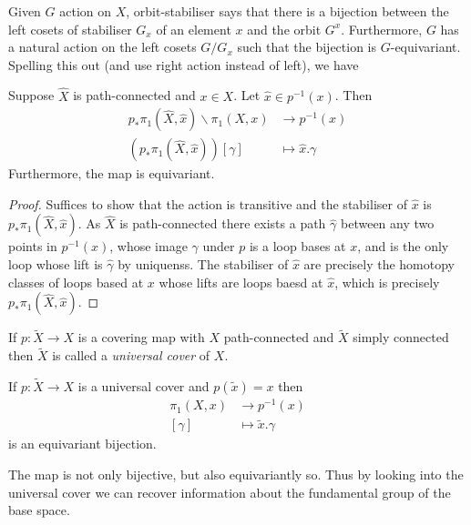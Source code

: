 \documentclass[a4paper]{article}
\begin{document}
Given \(G\) action on \(X\), orbit-stabiliser says that there is a bijection between the left cosets of stabiliser \(G_x\) of an element \(x\) and the orbit \(G^x\). Furthermore, \(G\) has a natural action on the left cosets \(G/G_x\) such that the bijection is \(G\)-equivariant. Spelling this out (and use right action instead of left), we have

\begin{lemma}
  Suppose \(\hat X\) is path-connected and \(x \in X\). Let \(\hat x \in p^{-1}(x)\). Then
  \begin{align*}
    p_*\pi_1(\hat X, \hat x) \backslash \pi_1(X, x) &\to p^{-1}(x) \\
    (p_* \pi_1(\hat X, \hat x)) [\gamma] &\mapsto \hat x. \gamma
  \end{align*}
  Furthermore, the map is equivariant.
\end{lemma}

\begin{proof}
  Suffices to show that the action is transitive and the stabiliser of \(\hat x\) is \(p_* \pi_1(\hat X, \hat x)\). As \(\hat X\) is path-connected there exists a path \(\hat \gamma\) between any two points in \(p^{-1}(x)\), whose image \(\gamma\) under \(p\) is a loop bases at \(x\), and is the only loop whose lift is \(\hat \gamma\) by uniquenss. The stabiliser of \(\hat x\) are precisely the homotopy classes of loops based at \(x\) whose lifts are loops baesd at \(\hat x\), which is precisely \(p_* \pi_1(\hat X, \hat x)\).
\end{proof}

\begin{definition}
  If \(p: \tilde X \to X\) is a covering map with \(X\) path-connected and \(\tilde X\) simply connected then \(\tilde X\) is called a \emph{universal cover} of \(X\).
\end{definition}

\begin{corollary}
  If \(p: \tilde X \to X\) is a universal cover and \(p(\tilde x) = x\) then
  \begin{align*}
    \pi_1(X, x) &\to p^{-1}(x) \\
    [\gamma] &\mapsto \tilde x . \gamma
  \end{align*}
  is an equivariant bijection.
\end{corollary}

The map is not only bijective, but also equivariantly so. Thus by looking into the universal cover we can recover information about the fundamental group of the base space.
\end{document}
